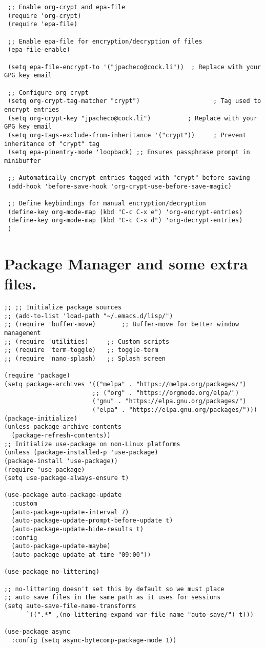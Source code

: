 \documentclass[11pt]{article}
\begin{document}
\begin{verbatim}
 ;; Enable org-crypt and epa-file
 (require 'org-crypt)
 (require 'epa-file)

 ;; Enable epa-file for encryption/decryption of files
 (epa-file-enable)

 (setq epa-file-encrypt-to '("jpacheco@cock.li"))  ; Replace with your GPG key email

 ;; Configure org-crypt
 (setq org-crypt-tag-matcher "crypt")                    ; Tag used to encrypt entries
 (setq org-crypt-key "jpacheco@cock.li")          ; Replace with your GPG key email
 (setq org-tags-exclude-from-inheritance '("crypt"))     ; Prevent inheritance of "crypt" tag
 (setq epa-pinentry-mode 'loopback) ;; Ensures passphrase prompt in minibuffer

 ;; Automatically encrypt entries tagged with "crypt" before saving
 (add-hook 'before-save-hook 'org-crypt-use-before-save-magic)

 ;; Define keybindings for manual encryption/decryption
 (define-key org-mode-map (kbd "C-c C-x e") 'org-encrypt-entries)
 (define-key org-mode-map (kbd "C-c C-x d") 'org-decrypt-entries)
 )
\end{verbatim}
\section{Package Manager and some extra files.}
\label{sec:orgc54ed1a}
\begin{verbatim}
;; ;; Initialize package sources
;; (add-to-list 'load-path "~/.emacs.d/lisp/")
;; (require 'buffer-move)   	;; Buffer-move for better window management
;; (require 'utilities)		;; Custom scripts
;; (require 'term-toggle)	;; toggle-term
;; (require 'nano-splash)	;; Splash screen

(require 'package)
(setq package-archives '(("melpa" . "https://melpa.org/packages/")
                        ;; ("org" . "https://orgmode.org/elpa/")
                        ("gnu" . "https://elpa.gnu.org/packages/")
                        ("elpa" . "https://elpa.gnu.org/packages/")))
(package-initialize)
(unless package-archive-contents
  (package-refresh-contents))
;; Initialize use-package on non-Linux platforms
(unless (package-installed-p 'use-package)
(package-install 'use-package))
(require 'use-package)
(setq use-package-always-ensure t)

(use-package auto-package-update
  :custom
  (auto-package-update-interval 7)
  (auto-package-update-prompt-before-update t)
  (auto-package-update-hide-results t)
  :config
  (auto-package-update-maybe)
  (auto-package-update-at-time "09:00"))

(use-package no-littering)

;; no-littering doesn't set this by default so we must place
;; auto save files in the same path as it uses for sessions
(setq auto-save-file-name-transforms
      `((".*" ,(no-littering-expand-var-file-name "auto-save/") t)))

(use-package async
  :config (setq async-bytecomp-package-mode 1))
\end{verbatim}
\end{document}
